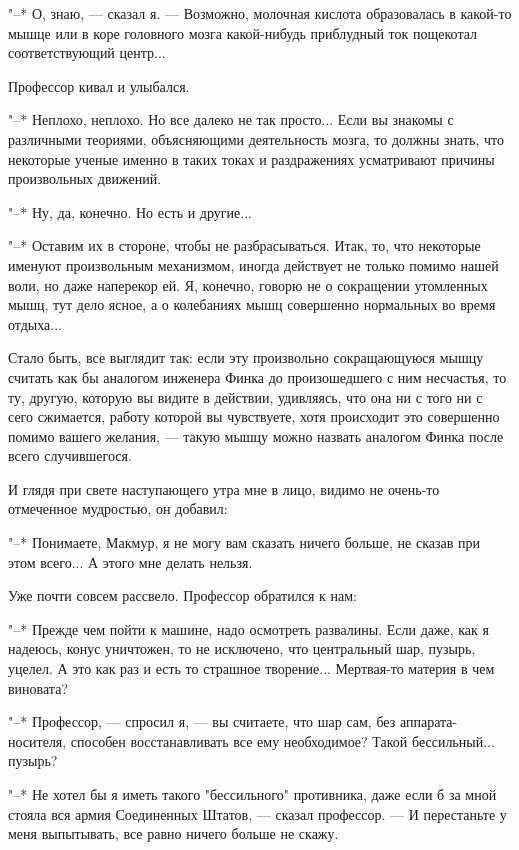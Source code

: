"--* О, знаю, --- сказал я. ---  Возможно,  молочная  кислота  образовалась  в
какой-то мышце или в коре  головного  мозга  какой-нибудь  приблудный  ток
пощекотал соответствующий центр...

Профессор кивал и улыбался.

"--* Неплохо, неплохо. Но все далеко не так просто... Если  вы  знакомы  с
различными теориями, объясняющими деятельность мозга, то должны знать, что
некоторые ученые именно в таких токах и раздражениях  усматривают  причины
произвольных движений.

"--* Ну, да, конечно. Но есть и другие...

"--* Оставим  их  в  стороне,  чтобы  не  разбрасываться.  Итак,  то,  что
некоторые именуют произвольным  механизмом,  иногда  действует  не  только
помимо нашей  воли,  но  даже  наперекор  ей.  Я,  конечно,  говорю  не  о
сокращении утомленных мышц, тут дело ясное, а о колебаниях мышц совершенно
нормальных во время отдыха...

Стало быть, все выглядит так: если эту произвольно сокращающуюся  мышцу
считать как бы аналогом инженера Финка до произошедшего с  ним  несчастья,
то ту, другую, которую вы видите в действии, удивляясь, что она ни с  того
ни с сего сжимается, работу которой вы  чувствуете,  хотя  происходит  это
совершенно помимо вашего желания, --- такую  мышцу  можно  назвать  аналогом
Финка после всего случившегося.

И глядя при свете наступающего утра мне  в  лицо,  видимо  не  очень-то
отмеченное мудростью, он добавил:

"--* Понимаете, Макмур, я не могу вам сказать ничего больше, не сказав при
этом всего... А этого мне делать нельзя.

Уже почти совсем рассвело. Профессор обратился к нам:

"--* Прежде чем пойти к машине, надо осмотреть развалины. Если даже, как я
надеюсь, конус уничтожен, то не исключено, что  центральный  шар,  пузырь,
уцелел. А это как раз и есть то страшное творение... Мертвая-то материя  в
чем виновата?

"--*  Профессор,  ---  спросил  я,  ---  вы  считаете,  что   шар   сам,   без
аппарата-носителя, способен восстанавливать  все  ему  необходимое?  Такой
бессильный... пузырь?

"--* Не хотел бы я иметь такого "бессильного" противника, даже если  б  за
мной стояла  вся  армия  Соединенных  Штатов,  ---  сказал  профессор.  ---  И
перестаньте у меня выпытывать, все равно ничего больше не скажу.

